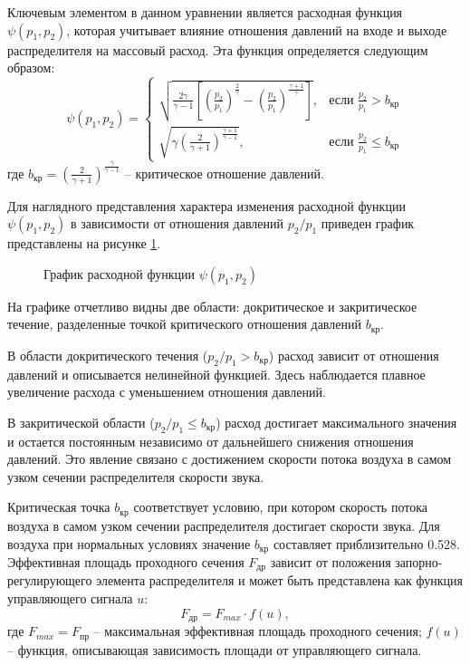 Ключевым элементом в данном уравнении является расходная функция $\psi(p_1, p_2)$, которая
учитывает влияние отношения давлений на входе и выходе распределителя
на массовый расход. Эта функция определяется следующим образом:
\begin{equation*}
    \psi(p_1, p_2) = \begin{cases}
        \sqrt{\frac{2\gamma}{\gamma-1}\left[\left(\frac{p_2}{p_1}\right)^{\frac{2}{\gamma}} - \left(\frac{p_2}{p_1}\right)^{\frac{\gamma+1}{\gamma}}\right]}, & \text{если } \frac{p_2}{p_1} > b_{кр}    \\
        \sqrt{\gamma \left(\frac{2}{\gamma+1}\right)^{\frac{\gamma+1}{\gamma-1}}},                                                                            & \text{если } \frac{p_2}{p_1} \leq b_{кр}
    \end{cases}
\end{equation*}
где
$b_{кр} = \left(\frac{2}{\gamma+1}\right)^{\frac{\gamma}{\gamma-1}}$ -- критическое отношение давлений.

Для наглядного представления характера изменения расходной функции
$\psi(p_1, p_2)$ в зависимости от отношения давлений $p_2/p_1$
приведен график представлены на рисунке \ref{fig:ch2/mass_flow_function}.
\begin{figure}
    \caption{График расходной функции $\psi(p_1, p_2)$}
    \label{fig:ch2/mass_flow_function}
\end{figure}

На графике отчетливо видны две области: докритическое и закритическое течение, разделенные точкой
критического отношения давлений $b_{кр}$.

В области докритического течения ($p_2/p_1 > b_{кр}$) расход зависит от отношения давлений и
описывается нелинейной функцией. Здесь наблюдается плавное увеличение расхода с уменьшением отношения давлений.

В закритической области ($p_2/p_1 \leq b_{кр}$) расход достигает максимального
значения и остается постоянным независимо от дальнейшего снижения отношения давлений.
Это явление связано с достижением скорости потока воздуха
в самом узком сечении распределителя скорости звука.

Критическая точка $b_{кр}$ соответствует условию, при котором скорость потока
воздуха в самом узком сечении распределителя достигает скорости звука. Для
воздуха при нормальных условиях значение $b_{кр}$ составляет приблизительно \num{0.528}.
Эффективная площадь проходного сечения $F_\text{др}$ зависит от
положения запорно-регулирующего элемента распределителя и может
быть представлена как функция управляющего сигнала $u$:
\begin{equation*}
    F_\text{др} = F_{max} \cdot f(u),
\end{equation*}
где $F_{max} = F_\text{пр}$ -- максимальная эффективная площадь проходного сечения;
$f(u)$ -- функция, описывающая зависимость площади от управляющего сигнала.

